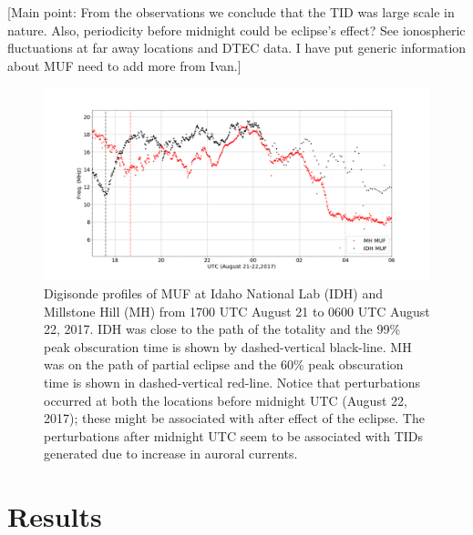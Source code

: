 [Main point: From the observations we conclude that the TID was large scale in nature. Also, periodicity before midnight could be eclipse's effect? See ionospheric fluctuations at far away locations and DTEC data. I have put generic information about MUF need to add more from Ivan.]
   \begin{figure}
 \centering\includegraphics[width=35pc]{digi_muf_21-22.png}
 \caption{Digisonde profiles of MUF  at Idaho National Lab (IDH) and Millstone Hill (MH) from 1700 UTC August 21 to 0600 UTC August 22, 2017. IDH was close to the path of the totality and the  99\% peak obscuration time is shown by dashed-vertical black-line. MH was on the path of partial eclipse and the 60\% peak obscuration time is shown in dashed-vertical red-line. Notice that perturbations occurred at both the locations before midnight UTC (August 22, 2017); these might be associated with after effect of the eclipse. The perturbations after midnight UTC seem to be associated with TIDs generated due to increase in auroral currents.}
 \label{fig:digi}
 \end{figure}
 

\section{Results}

